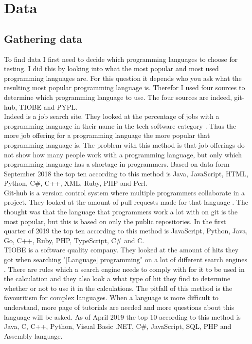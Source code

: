 \chapter{Data}
\label{ch:data}

\section{Gathering data}
To find data I first need to decide which programming languages to choose for testing. I did this by looking into what the most popular and most used programming languages are. For this question it depends who you ask what the resulting most popular programming language is. Therefor I used four sources to determine which programming language to use. The four sources are indeed, git-hub, TIOBE and PYPL.\\

Indeed is a job search site. They looked at the percentage of jobs with a programming language in their name in the tech software category \cite{ray:2018}. Thus the more job offering for a programming language the more popular that programming language is. The problem with this method is that job offerings do not show how many people work with a programming language, but only which programming language has a shortage in programmers. Based on data form September 2018 the top ten according to this method is Java, JavaScript, HTML, Python, C\#, C++, XML, Ruby, PHP and Perl.\\

Git-hub is a version control system where multiple programmers collaborate in a project. They looked at the amount of pull requests made for that language \cite{zap:2019}. The thought was that the language that programmers work a lot with on git is the most popular, but this is based on only the public repositories. In the first quarter of 2019 the top ten according to this method is JavaScript, Python, Java, Go, C++, Ruby, PHP, TypeScript, C\# and C. \\

TIOBE is a software quality company. They looked at the amount of hits they got when searching "[Language] programming" on a lot of different search engines \cite{tio:2019}. There are rules which a search engine needs to comply with for it to be used in the calculation and they also look a what type of hit they find to determine whether or not to use it in the calculations. The pitfall of this method is the favouritism for complex languages. When a language is more difficult to understand, more page of tutorials are needed and more questions about this language will be asked. As of April 2019 the top 10 according to this method is Java, C, C++, Python, Visual Basic .NET, C\#, JavaScript, SQL, PHP and Assembly language.\\

